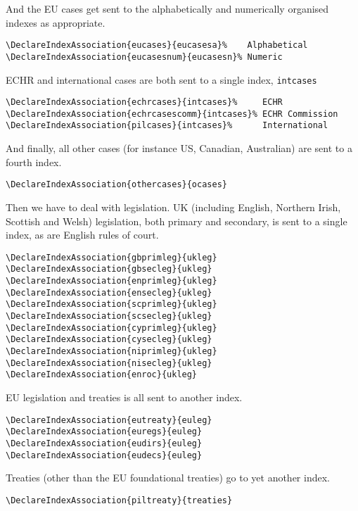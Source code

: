 \documentclass[a4paper,
               11pt,
	       DIV=1,			   
	       footinclude=false]
	      {scrartcl}
\begin{document}
And the EU cases get sent to the alphabetically and numerically organised indexes as appropriate.
\begin{verbatim}
\DeclareIndexAssociation{eucases}{eucasesa}%    Alphabetical
\DeclareIndexAssociation{eucasesnum}{eucasesn}% Numeric
\end{verbatim}

ECHR and international cases are both sent to a single index, \texttt{intcases}
\begin{verbatim}
\DeclareIndexAssociation{echrcases}{intcases}%     ECHR
\DeclareIndexAssociation{echrcasescomm}{intcases}% ECHR Commission
\DeclareIndexAssociation{pilcases}{intcases}%      International
\end{verbatim}

And finally, all other cases (for instance US, Canadian, Australian) are sent to a fourth index.

\begin{verbatim}
\DeclareIndexAssociation{othercases}{ocases}
\end{verbatim}

Then we have to deal with legislation. UK (including English, Northern Irish, Scottish and Welsh) legislation, both primary and secondary, is sent to a single index, as are English rules of court.
\begin{verbatim}
\DeclareIndexAssociation{gbprimleg}{ukleg}
\DeclareIndexAssociation{gbsecleg}{ukleg}
\DeclareIndexAssociation{enprimleg}{ukleg}
\DeclareIndexAssociation{ensecleg}{ukleg}
\DeclareIndexAssociation{scprimleg}{ukleg}
\DeclareIndexAssociation{scsecleg}{ukleg}
\DeclareIndexAssociation{cyprimleg}{ukleg}
\DeclareIndexAssociation{cysecleg}{ukleg}
\DeclareIndexAssociation{niprimleg}{ukleg}
\DeclareIndexAssociation{nisecleg}{ukleg}
\DeclareIndexAssociation{enroc}{ukleg}
\end{verbatim}

EU legislation and treaties is all sent to another index.
\begin{verbatim}
\DeclareIndexAssociation{eutreaty}{euleg}
\DeclareIndexAssociation{euregs}{euleg}
\DeclareIndexAssociation{eudirs}{euleg}
\DeclareIndexAssociation{eudecs}{euleg}
\end{verbatim}

Treaties (other than the EU foundational treaties) go to yet another index.

\begin{verbatim}
\DeclareIndexAssociation{piltreaty}{treaties}
\end{verbatim}
\end{document}
